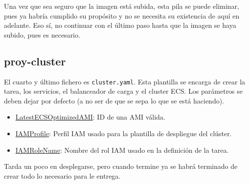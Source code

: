 Una vez que sea seguro que la imagen está subida, esta pila se puede eliminar, pues ya habría cumplido su propósito y no se necesita su existencia de aquí en adelante. Eso sí, no continuar con el último paso hasta que la imagen se haya subido, pues es necesario.

\subsection{proy-cluster}

El cuarto y último fichero es \texttt{cluster.yaml}. Esta plantilla se encarga de crear la tarea, los servicios, el balanceador de carga y el cluster ECS. Los parámetros se deben dejar por defecto (a no ser de que se sepa lo que se está haciendo).

\begin{itemize}
    \item \underline{LatestECSOptimizedAMI}: ID de una AMI válida.
    \item \underline{IAMProfile}: Perfil IAM usado para la plantilla de despliegue del clúster.
    \item \underline{IAMRoleName}: Nombre del rol IAM usado en la definición de la tarea.
\end{itemize}

Tarda un poco en desplegarse, pero cuando termine ya se habrá terminado de crear todo lo necesario para le entrega.
